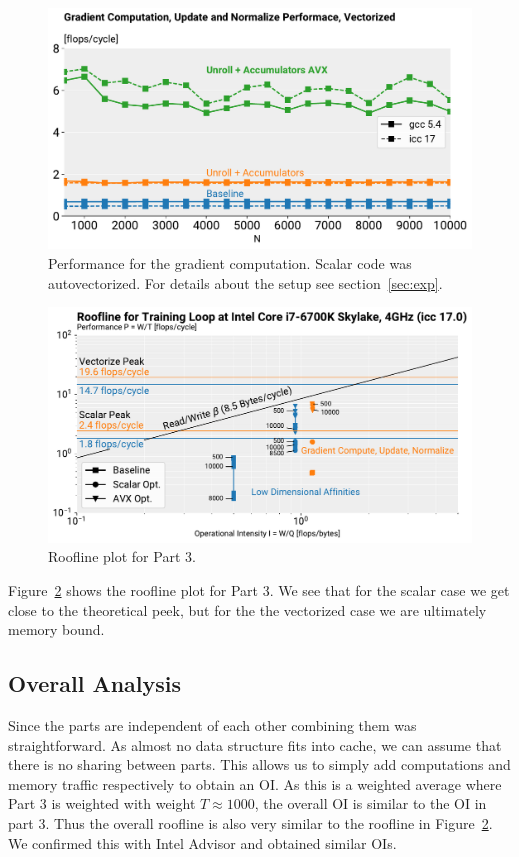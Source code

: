 \documentclass[letterpaper]{article}
\begin{document}
\begin{figure}[h]
  \includegraphics[width=\linewidth]{images/gradient_vec}
  \caption{Performance for the gradient computation. Scalar code was autovectorized. For details about the setup see section~\ref{sec:exp}.}
   \label{fig:bench:gradient}
   \vspace{-5mm}
\end{figure}

\begin{figure}[h]
  \includegraphics[width=\linewidth]{images/roofline_training_loop}
  \caption{Roofline plot for Part 3.}
   \label{fig:roofline:training}
   \vspace{-5mm}
\end{figure}

Figure~\ref{fig:roofline:training} shows the roofline plot for Part 3. We see that for the scalar case we get close to the theoretical peek, but for the the vectorized case we are ultimately memory bound.

\subsection{Overall Analysis}
Since the parts are independent of each other combining them was straightforward. As almost no data structure fits into cache, we can assume that there is no sharing between parts. This allows us to simply add computations and memory traffic respectively to obtain an OI. As this is a weighted average where Part 3 is weighted with weight $T \approx 1000$, the overall OI is similar to the OI in part 3. Thus the overall roofline is also very similar to the roofline in Figure~\ref{fig:roofline:training}. We confirmed this with Intel Advisor and obtained similar OIs.
\end{document}

